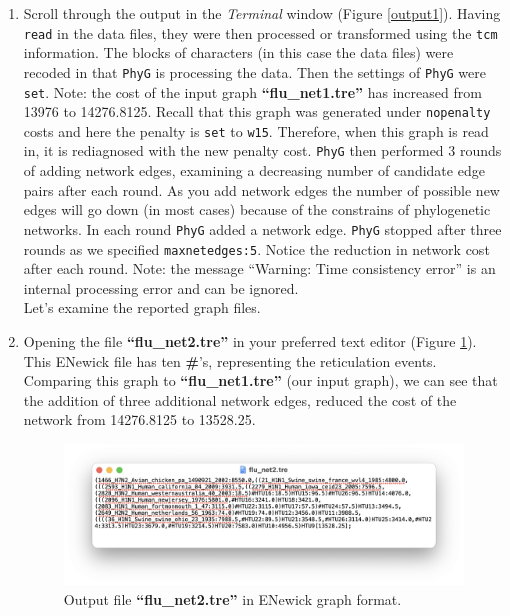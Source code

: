\documentclass[11pt]{article}
\newcommand{\phyg}{\texttt{PhyG} }
\begin{document}
\begin {enumerate}
\item Scroll through the output in the \textit{Terminal} window (Figure \ref{output1}). 
Having \texttt{read} in the data files, they were then processed or transformed using 
the \texttt{tcm} information. The blocks of characters (in this case the data files) were 
recoded in that \phyg is processing the data. Then the settings of \phyg were \texttt{set}. 
Note: the cost of the input graph \textbf{``flu\_net1.tre''} has increased from 13976 to 
14276.8125. Recall that this graph was generated under \texttt{nopenalty} costs and 
here the penalty is \texttt{set} to \texttt{w15}. Therefore, when this graph is read in, it 
is rediagnosed with the new penalty cost. \phyg then performed 3 rounds of adding 
network edges, examining a decreasing number of candidate edge pairs after each 
round. As you add network edges the number of possible new edges will go down 
(in most cases) because of the constrains of phylogenetic networks. In each round 
\phyg added a network edge. \phyg stopped after three rounds as we specified 
\texttt{maxnetedges:5}. Notice the reduction in network cost after each round. Note:
the message ``Warning: Time consistency error'' is an internal processing error and 
can be ignored.\\

Let's examine the reported graph files. 

\item Opening the file \textbf{``flu\_net2.tre''} in your preferred text editor (Figure 
\ref{tre2}). This ENewick file has ten \textbf{\#}'s, representing the reticulation events. 
Comparing this graph to \textbf{``flu\_net1.tre''} (our input graph), we can see that 
the addition of three additional network edges, reduced the cost of the network from 
14276.8125 to 13528.25. 

\begin{figure}[H]
\centering
\includegraphics[width=\textwidth]{tre2.png}
\caption{Output file \textbf{``flu\_net2.tre''} in ENewick graph format.}
\label{tre2}
\end{figure}


\end{enumerate}
\end{document}
